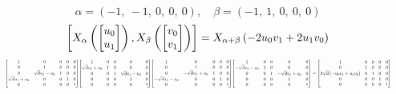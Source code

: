 \documentclass[11pt]{article}
\theoremstyle{definition}
\begin{document}
\[
\alpha = \left( -1, \  -1, \  0, \  0, \  0\right), \quad \beta = \left( -1, \  1, \  0, \  0, \  0\right)
\]
\[
\scaletoalign{\textwidth}{\left[ X_{\alpha}\left(\left[\begin{matrix}u_{0}\\u_{1}\end{matrix}\right]\right), X_{\beta}\left(\left[\begin{matrix}v_{0}\\v_{1}\end{matrix}\right]\right) \right] = X_{\alpha + \beta}\left(- 2 u_{0} v_{1} + 2 u_{1} v_{0}\right)}
\]
\[
\scaletoalign{\textwidth}{{\left[\begin{matrix}1 & 0 & 0 & 0 & 0\\0 & 1 & 0 & 0 & 0\\0 & \sqrt{d} u_{1} - u_{0} & 1 & 0 & 0\\\sqrt{d} u_{1} + u_{0} & 0 & 0 & 1 & 0\\0 & 0 & 0 & 0 & 1\end{matrix}\right]} {\left[\begin{matrix}1 & 0 & 0 & 0 & 0\\\sqrt{d} v_{1} + v_{0} & 1 & 0 & 0 & 0\\0 & 0 & 1 & \sqrt{d} v_{1} - v_{0} & 0\\0 & 0 & 0 & 1 & 0\\0 & 0 & 0 & 0 & 1\end{matrix}\right]} {\left[\begin{matrix}1 & 0 & 0 & 0 & 0\\0 & 1 & 0 & 0 & 0\\0 & - \sqrt{d} u_{1} + u_{0} & 1 & 0 & 0\\- \sqrt{d} u_{1} - u_{0} & 0 & 0 & 1 & 0\\0 & 0 & 0 & 0 & 1\end{matrix}\right]} {\left[\begin{matrix}1 & 0 & 0 & 0 & 0\\- \sqrt{d} v_{1} - v_{0} & 1 & 0 & 0 & 0\\0 & 0 & 1 & - \sqrt{d} v_{1} + v_{0} & 0\\0 & 0 & 0 & 1 & 0\\0 & 0 & 0 & 0 & 1\end{matrix}\right]} = {\left[\begin{matrix}1 & 0 & 0 & 0 & 0\\0 & 1 & 0 & 0 & 0\\2 \sqrt{d} \left(- u_{0} v_{1} + u_{1} v_{0}\right) & 0 & 1 & 0 & 0\\0 & 0 & 0 & 1 & 0\\0 & 0 & 0 & 0 & 1\end{matrix}\right]}}
\]
\end{document}
